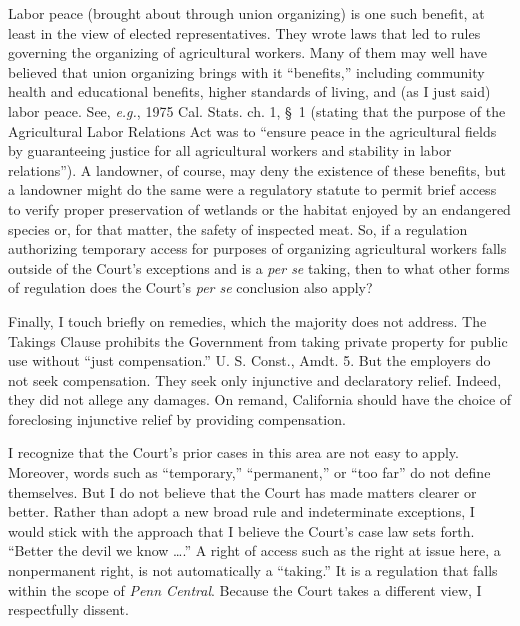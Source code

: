 Labor peace (brought about through union organizing) is one such benefit, at
least in the view of elected representatives. They wrote laws that led to rules
governing the organizing of agricultural workers. Many of them may well have
believed that union organizing brings with it ``benefits,'' including community
health and educational benefits, higher standards of living, and (as I just
said) labor peace. See, \textit{e.g.}, 1975 Cal. Stats. ch. 1, \S~1 (stating
that the purpose of the Agricultural Labor Relations Act was to ``ensure peace
in the agricultural fields by guaranteeing justice for all agricultural workers
and stability in labor relations''). A landowner, of course, may deny the
existence of these benefits, but a landowner might do the same were a regulatory
statute to permit brief access to verify proper preservation of wetlands or the
habitat enjoyed by an endangered species or, for that matter, the safety of
inspected meat. So, if a regulation authorizing temporary access for purposes of
organizing agricultural workers falls outside of the Court's exceptions and is a
\textit{per se} taking, then to what other forms of regulation does the Court's
\textit{per se} conclusion also apply?



Finally, I touch briefly on remedies, which the majority does not address. The
Takings Clause prohibits the Government from taking private property for public
use without ``just compensation.'' U. S. Const., Amdt. 5. But the employers do
not seek compensation. They seek only injunctive and declaratory relief. Indeed,
they did not allege any damages. On remand, California should have the choice of
foreclosing injunctive relief by providing compensation. 

\readinghead{* * *}

I recognize that the Court's prior cases in this area are not easy to apply.
Moreover, words such as ``temporary,'' ``permanent,'' or ``too far'' do not
define themselves. But I do not believe that the Court has made matters clearer
or better. Rather than adopt a new broad rule and indeterminate exceptions, I
would stick with the approach that I believe the Court's case law sets forth.
``Better the devil we know \ldots.'' A right of access such as the right at
issue here, a nonpermanent right, is not automatically a ``taking.'' It is a
regulation that falls within the scope of \textit{Penn Central}. Because the
Court takes a different view, I respectfully dissent.

